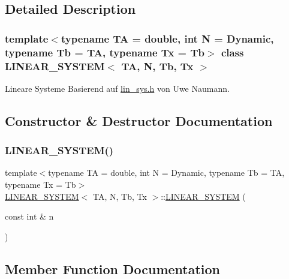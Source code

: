 \subsection{Detailed Description}
\subsubsection*{template$<$typename TA = double, int N = Dynamic, typename Tb = TA, typename Tx = Tb$>$\newline
class L\+I\+N\+E\+A\+R\+\_\+\+S\+Y\+S\+T\+E\+M$<$ T\+A, N, Tb, Tx $>$}

Lineare Systeme Basierend auf \mbox{\hyperlink{lin__sys_8h}{lin\+\_\+sys.\+h}} von Uwe Naumann. 

\subsection{Constructor \& Destructor Documentation}
\mbox{\label{class_l_i_n_e_a_r___s_y_s_t_e_m_a7486740300aa9998e1aa4f9d90790eb2}} 
\subsubsection{\texorpdfstring{L\+I\+N\+E\+A\+R\+\_\+\+S\+Y\+S\+T\+E\+M()}{LINEAR\_SYSTEM()}}
{\footnotesize\ttfamily template$<$typename TA = double, int N = Dynamic, typename Tb = TA, typename Tx = Tb$>$ \\
\mbox{\hyperlink{class_l_i_n_e_a_r___s_y_s_t_e_m}{L\+I\+N\+E\+A\+R\+\_\+\+S\+Y\+S\+T\+EM}}$<$ TA, N, Tb, Tx $>$\+::\mbox{\hyperlink{class_l_i_n_e_a_r___s_y_s_t_e_m}{L\+I\+N\+E\+A\+R\+\_\+\+S\+Y\+S\+T\+EM}} (\begin{DoxyParamCaption}\item[{const int \&}]{n }\end{DoxyParamCaption})\hspace{0.3cm}{\ttfamily [inline]}}



\subsection{Member Function Documentation}
\mbox{\label{class_l_i_n_e_a_r___s_y_s_t_e_m_a307c8896bb3218768f016a2a24de3bcd}} 
